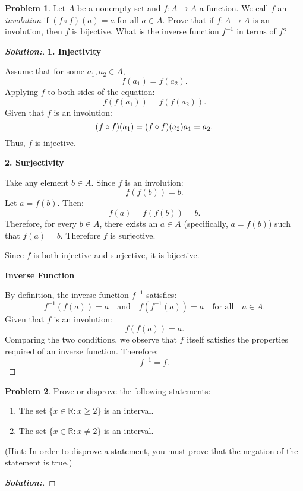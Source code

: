 \documentclass[12pt]{article}
\theoremstyle{definition}\newtheorem{problem}{Problem}
\newenvironment{solution}{\begin{proof}[\bfseries\textup{Solution:}]}{\end{proof}}
\newcommand{\R}{\mathbb{R}}
\begin{document}
\newpage
\begin{problem}
Let $A$ be a nonempty set and $f:A\to A$ a function.  We call $f$ an \emph{involution} if $(f\circ f)(a) = a$ for all $a\in A$.  Prove that if $f:A\to A$ is an involution, then $f$ is bijective.  What is the inverse function $f^{-1}$ in terms of $f$?
\end{problem}
\begin{solution}
    \textbf{1. Injectivity}
    
    Assume that for some \( a_1, a_2 \in A \),
    $$
    f(a_1) = f(a_2).
    $$
    Applying \( f \) to both sides of the equation:
    $$
    f(f(a_1)) = f(f(a_2)).
    $$
    Given that \( f \) is an involution:
    $$
    (f \circ f)(a_1) = (f \circ f)(a_2) \\
    a_1 = a_2.
    $$
    Thus, \( f \) is injective.
    
    \textbf{2. Surjectivity}
    
    Take any element \( b \in A \). Since \( f \) is an involution:
    $$
    f(f(b)) = b.
    $$
    Let \( a = f(b) \). Then:
    $$
    f(a) = f(f(b)) = b.
    $$
    Therefore, for every \( b \in A \), there exists an \( a \in A \) (specifically, \( a = f(b) \)) such that \( f(a) = b \). Therefore \( f \) is surjective.
    
    Since \( f \) is both injective and surjective, it is bijective.
    
    \textbf{Inverse Function}
    
    By definition, the inverse function \( f^{-1} \) satisfies:
    $$
    f^{-1}(f(a)) = a \quad \text{and} \quad f(f^{-1}(a)) = a \quad \text{for all} \quad a \in A.
    $$
    Given that \( f \) is an involution:
    $$
    f(f(a)) = a.
    $$
    Comparing the two conditions, we observe that \( f \) itself satisfies the properties required of an inverse function. Therefore:
    $$
    f^{-1} = f.
    $$
    
    
\end{solution}

\newpage
\begin{problem}
Prove or disprove the following statements:
\begin{enumerate}
\item The set $\{ x\in\R : x\geq 2 \}$ is an interval.
\item The set $\{ x\in\R : x\neq 2 \}$ is an interval.
\end{enumerate}
(Hint:  In order to disprove a statement, you must prove that the negation of the statement is true.)
\end{problem}
\begin{solution}

    

\end{solution}
\end{document}
